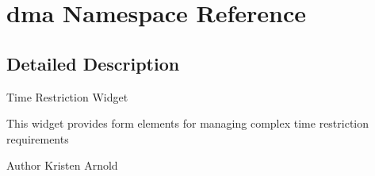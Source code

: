 \hypertarget{namespacedma}{\section{dma Namespace Reference}
\label{namespacedma}
}


\subsection{Detailed Description}
Time Restriction Widget

This widget provides form elements for managing complex time restriction requirements

\begin{DoxyAuthor}{Author}
Kristen Arnold 
\end{DoxyAuthor}
